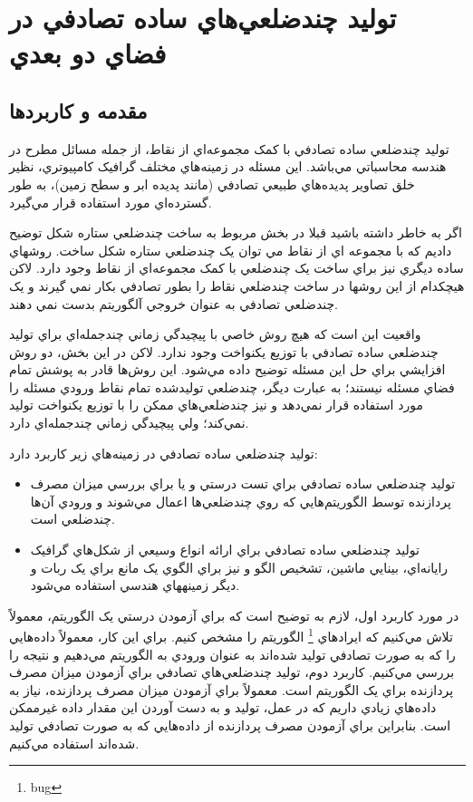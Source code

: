 \documentclass{book}
\begin{document}
\section{توليد چندضلعي‌هاي ساده تصادفي در فضاي دو بعدي}

\subsection{مقدمه و کاربردها}
توليد چندضلعي ساده تصادفي با کمک مجموعه‌اي از نقاط، از جمله مسائل مطرح در هندسه محاسباتي مي‌باشد. اين مسئله در زمينه‌هاي مختلف گرافيک کامپيوتري، نظير خلق تصاوير پديده‌هاي طبيعي تصادفي (مانند پديده ابر و سطح زمين)، به طور گسترده‌اي مورد استفاده قرار مي‌گيرد. 

اگر به خاطر داشته باشيد قبلا در بخش مربوط به ساخت چندضلعي ستاره شکل توضيح داديم که با مجموعه اي از نقاط مي توان يک چندضلعي ستاره شکل ساخت. روشهاي ساده ديگري نيز براي ساخت يک چندضلعي با کمک مجموعه‌اي از نقاط وجود دارد. لاکن هيچکدام از اين روشها در ساخت چندضلعي نقاط را بطور تصادفي بکار نمي گيرند و يک چندضلعي تصادفي به عنوان خروجي آلگوريتم بدست نمي دهند.

واقعيت اين است که هيچ روش خاصي با پيچيدگي زماني چندجمله‌اي براي توليد چندضلعي ساده تصادفي با توزيع يکنواخت وجود ندارد. لاکن در اين بخش، دو روش‌ افزايشي براي حل اين مسئله توضيح داده مي‌شود. اين روش‌ها قادر به پوشش تمام فضاي مسئله نيستند؛ به عبارت ديگر، چندضلعي توليدشده تمام نقاط ورودي مسئله را مورد استفاده قرار نمي‌دهد و نيز چندضلعي‌هاي ممکن را با توزيع يکنواخت توليد نمي‌کند؛ ولي پيچيدگي زماني چندجمله‌اي دارد.  

توليد چندضلعي‌ ساده تصادفي در زمينه‌هاي زير کاربرد دارد:

\begin{itemize}
    \item
    توليد چندضلعي‌ ساده تصادفي براي تست درستي و يا براي بررسي ميزان مصرف پردازنده توسط الگوريتم‌هايي که روي چندضلعي‌ها اعمال مي‌شوند و ورودي آن‌ها چندضلعي است.
    \item
    توليد چندضلعي‌ ساده تصادفي براي ارائه انواع وسيعي از شکل‌هاي گرافيک رايانه‌اي، بينايي ماشين، تشخيص الگو و نيز براي الگوي يک مانع براي يک ربات و ديگر زمينههاي هندسي استفاده مي‌شود.
\end{itemize}

در مورد کاربرد اول، لازم به توضيح است که براي آزمودن درستي يک الگوريتم، معمولاً تلاش مي‌کنيم که ايرادهاي \footnote{bug} الگوريتم را مشخص کنيم. براي اين ‌کار، معمولاً داده‌هايي را که به صورت تصادفي توليد شده‌اند به عنوان ورودي به الگوريتم مي‌دهيم و نتيجه را بررسي مي‌کنيم.
کاربرد دوم، توليد چندضلعي‌هاي تصادفي براي آزمودن ميزان مصرف پردازنده براي يک الگوريتم است. معمولاً براي آزمودن ميزان مصرف پردازنده، نياز به داده‌هاي زيادي داريم که در عمل، توليد و به دست آوردن اين مقدار داده غيرممکن است. بنابراين براي آزمودن مصرف پردازنده از داده‌هايي که به صورت تصادفي توليد شده‌اند استفاده مي‌کنيم.
\end{document}

